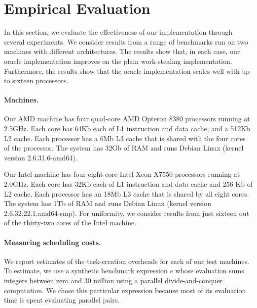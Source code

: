 \section{Empirical Evaluation}
\label{sec:exp}
\label{sec:empirical-evaluation}

In this section, we evaluate the effectiveness of our implementation
through several experiments. We consider results from a range of
benchmarks run on two machines with different architectures. The
results show that, in each case, our oracle implementation improves on
the plain work-stealing implementation. Furthermore, the results show
that the oracle implementation scales well with up to sixteen processors.

\paragraph{Machines.}

Our AMD machine has four quad-core AMD Opteron 8380 processors running
at 2.5GHz.  Each core has 64Kb each of L1 instruction and data cache,
and a 512Kb L2 cache. Each processor has a 6Mb L3 cache that is shared
with the four cores of the processor.  The system has 32Gb of RAM and
runs Debian Linux (kernel version 2.6.31.6-amd64).

Our Intel machine has four eight-core Intel Xeon X7550 processors
running at 2.0GHz. Each core has 32Kb each of L1 instruction and
data cache and 256 Kb of L2 cache. Each processor has an 18Mb L3 cache
that is shared by all eight cores. The system has 1Tb of RAM and runs
Debian Linux (kernel version 2.6.32.22.1.amd64-smp).
For uniformity, we consider results from just sixteen out of the
thirty-two cores of the Intel machine. 


\paragraph{Measuring scheduling costs.}

We report estimates of the task-creation overheads for each of our test
machines. To estimate, we use a synthetic benchmark expression $e$
whose evaluation sums integers between zero and 30 million using a
parallel divide-and-conquer computation. We chose this particular
expression because most of its evaluation time is spent evaluating
parallel pairs. 

